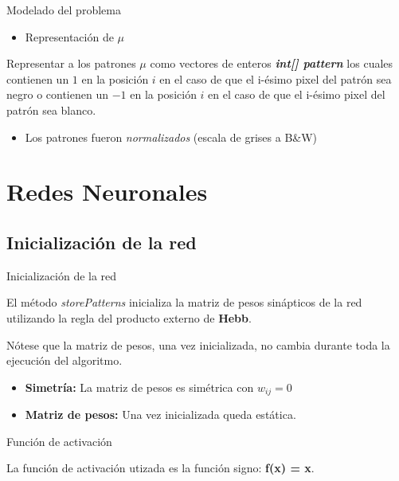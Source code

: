 \documentclass{beamer}
\begin{document}
\begin{frame}{Modelado del problema}
\begin{itemize}
\item Representación de $\mu$\\
\end{itemize}

\par Representar a los patrones $\mu$ como vectores de enteros \textbf{\textit{int[] pattern}} los cuales contienen un $1$ en la posición $i$ en el caso de que el i-ésimo pixel del patrón sea negro o contienen un $-1$ en la posición $i$ en el caso de que el i-ésimo pixel del patrón sea blanco.\\

\begin{itemize}
\item Los patrones fueron \textit{normalizados} (escala de grises a B\&W)
\end{itemize}

\end{frame}


\section{Redes Neuronales}

\subsection{Inicialización de la red}

\begin{frame}{Inicialización de la red}

\par El método \textit{storePatterns} inicializa la matriz de pesos sinápticos de la red utilizando la regla del producto externo de \textbf{Hebb}.\\
\par Nótese que la matriz de pesos, una vez inicializada, no cambia durante toda la ejecución del algoritmo.\\

\begin{itemize}
\item \textbf{Simetría:} La matriz de pesos es simétrica con $w_{ij} = 0$
\item \textbf{Matriz de pesos:} Una vez inicializada queda estática.
\end{itemize}
\end{frame}

\begin{frame}{Función de activación}

\par La función de activación utizada es la función signo: \textbf{f(x) = x}.

\end{frame}
\end{document}
